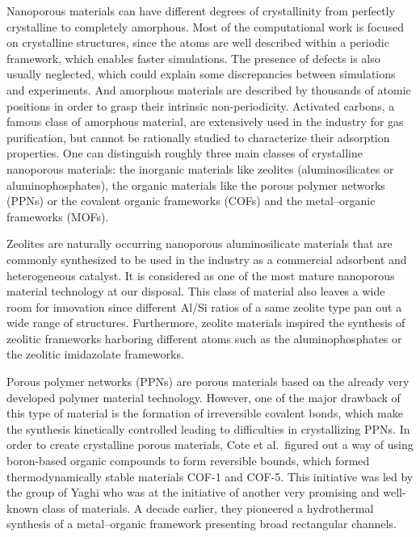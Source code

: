 \documentclass[main.tex]{subfiles}
\begin{document}
Nanoporous materials can have different degrees of crystallinity from perfectly crystalline to completely amorphous. Most of the computational work is focused on crystalline structures, since the atoms are well described within a periodic framework, which enables faster simulations. The presence of defects is also usually neglected, which could explain some discrepancies between simulations and experiments. And amorphous materials are described by thousands of atomic positions in order to grasp their intrinsic non-periodicity.\cite{Thyagarajan_2020} Activated carbons, a famous class of amorphous material, are extensively used in the industry for gas purification, but cannot be rationally studied to characterize their adsorption properties. One can distinguish roughly three main classes of crystalline nanoporous materials: the inorganic materials like zeolites (aluminosilicates or aluminophosphates), the organic materials like the porous polymer networks (PPNs) or the covalent organic frameworks (COFs) and the metal--organic frameworks (MOFs).

Zeolites are naturally occurring nanoporous aluminosilicate materials that are commonly synthesized to be used in the industry as a commercial adsorbent and heterogeneous catalyst.\cite{Ozin_1989,Ma_2000} It is considered as one of the most mature nanoporous material technology at our disposal. This class of material also leaves a wide room for innovation since different Al/Si ratios of a same zeolite type pan out a wide range of structures. Furthermore, zeolite materials inspired the synthesis of zeolitic frameworks harboring different atoms such as the aluminophosphates or the zeolitic imidazolate frameworks.\cite{Wang_2012,Chen_2014_zeo} 

Porous polymer networks (PPNs) are porous materials based on the already very developed polymer material technology.\cite{Lu_2010,Wang_2020,Che_2020} However, one of the major drawback of this type of material is the formation of irreversible covalent bonds, which make the synthesis kinetically controlled leading to difficulties in crystallizing PPNs.\cite{Feng_2012} In order to create crystalline porous materials, Cote et al.\ figured out a way of using boron-based organic compounds to form reversible bounds, which formed thermodynamically stable materials COF-1 and COF-5.\cite{Cote_2005} This initiative was led by the group of Yaghi who was at the initiative of another very promising and well-known class of materials. A decade earlier,  they pioneered a hydrothermal synthesis of a metal--organic framework presenting broad rectangular channels.\cite{Yaghi_1995} 
\end{document}
